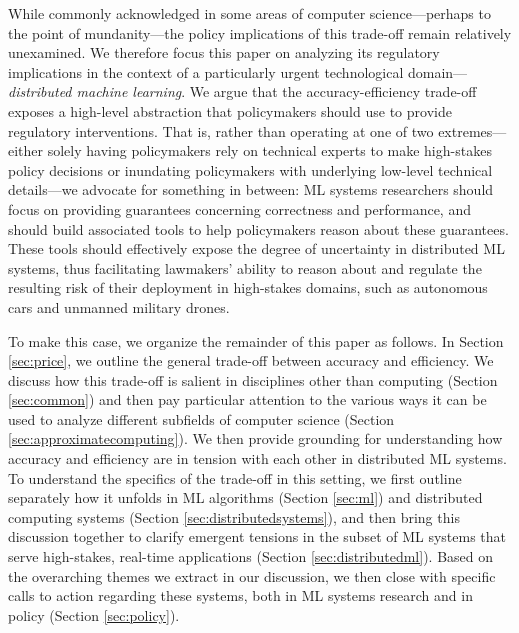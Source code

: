 \documentclass[sigplan,screen]{acmart}
\begin{document}
While commonly acknowledged in some areas of computer science---perhaps to the point of mundanity---the policy implications of this trade-off remain relatively unexamined. We therefore focus this paper on analyzing its regulatory implications in the context of a particularly urgent technological domain---\emph{distributed machine learning}. We argue that the accuracy-efficiency trade-off exposes a high-level abstraction that policymakers should use to provide regulatory interventions. That is, rather than operating at one of two extremes---either solely having policymakers rely on technical experts to make high-stakes policy decisions or inundating policymakers with underlying low-level technical details---we advocate for something in between: ML systems researchers should focus on providing guarantees concerning correctness and performance, and should build associated tools to help policymakers reason about these guarantees. These tools should effectively expose the degree of uncertainty in distributed ML systems, thus facilitating lawmakers' ability to reason about and regulate the resulting risk of their deployment in high-stakes domains, such as autonomous cars and unmanned military drones.  

To make this case, we organize the remainder of this paper as follows. In Section \ref{sec:price}, we outline the general trade-off between accuracy and efficiency. We discuss how this trade-off is salient in disciplines other than computing (Section \ref{sec:common}) and then pay particular attention to the various ways it can be used to analyze different subfields of computer science (Section \ref{sec:approximatecomputing}). We then provide grounding for understanding how accuracy and efficiency are in tension with each other in distributed ML systems. To understand the specifics of the trade-off in this setting, we first outline separately how it unfolds in ML algorithms (Section \ref{sec:ml}) and distributed computing systems (Section \ref{sec:distributedsystems}), and then bring this discussion together to clarify emergent tensions in the subset of ML systems that serve high-stakes, real-time applications (Section \ref{sec:distributedml}). Based on the overarching themes we extract in our discussion, we then close with specific calls to action regarding these systems, both in ML systems research and in policy (Section \ref{sec:policy}).
\end{document}
